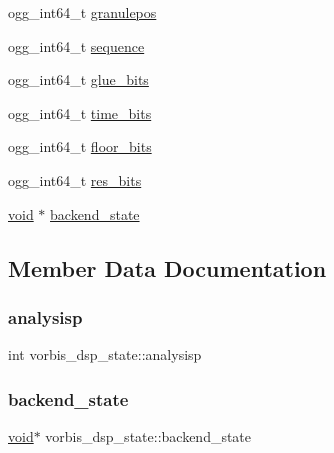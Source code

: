\begin{DoxyCompactItemize}
\item 
ogg\+\_\+int64\+\_\+t \mbox{\hyperlink{structvorbis__dsp__state_af84a7a4855db2744d1ef73f48cb6b352}{granulepos}}
\item 
ogg\+\_\+int64\+\_\+t \mbox{\hyperlink{structvorbis__dsp__state_a38a8b96daf9d16d8cce0522e203635a6}{sequence}}
\item 
ogg\+\_\+int64\+\_\+t \mbox{\hyperlink{structvorbis__dsp__state_ae2d065c13e84870fd889c82cd2e7a04f}{glue\+\_\+bits}}
\item 
ogg\+\_\+int64\+\_\+t \mbox{\hyperlink{structvorbis__dsp__state_adef49c2187f4ed3381973274e1b01151}{time\+\_\+bits}}
\item 
ogg\+\_\+int64\+\_\+t \mbox{\hyperlink{structvorbis__dsp__state_a2913a4ebbbd6721c53264a2ca8466cea}{floor\+\_\+bits}}
\item 
ogg\+\_\+int64\+\_\+t \mbox{\hyperlink{structvorbis__dsp__state_a3091c7fac6b57c54027c32931a7e6ee0}{res\+\_\+bits}}
\item 
\mbox{\hyperlink{_s_d_l__opengles2__gl2ext_8h_ae5d8fa23ad07c48bb609509eae494c95}{void}} $\ast$ \mbox{\hyperlink{structvorbis__dsp__state_a97ff4df8d289e5e3968029e47d7f8162}{backend\+\_\+state}}
\end{DoxyCompactItemize}


\subsection{Member Data Documentation}
\mbox{\label{structvorbis__dsp__state_a9b983a6901a311f2d354f2b6c51cf93b}} 
\subsubsection{\texorpdfstring{analysisp}{analysisp}}
{\footnotesize\ttfamily int vorbis\+\_\+dsp\+\_\+state\+::analysisp}

\mbox{\label{structvorbis__dsp__state_a97ff4df8d289e5e3968029e47d7f8162}} 
\subsubsection{\texorpdfstring{backend\+\_\+state}{backend\_state}}
{\footnotesize\ttfamily \mbox{\hyperlink{_s_d_l__opengles2__gl2ext_8h_ae5d8fa23ad07c48bb609509eae494c95}{void}}$\ast$ vorbis\+\_\+dsp\+\_\+state\+::backend\+\_\+state}

